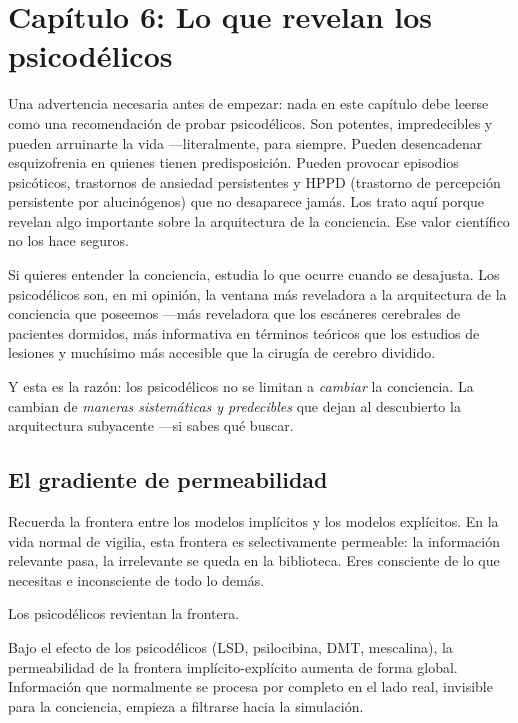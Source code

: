 \documentclass[11pt, twoside, openright]{book}
\begin{document}
\chapter*{Capítulo 6: Lo que revelan los psicodélicos}

Una advertencia necesaria antes de empezar: nada en este capítulo debe leerse como una recomendación de probar psicodélicos. Son potentes, impredecibles y pueden arruinarte la vida ---literalmente, para siempre. Pueden desencadenar esquizofrenia en quienes tienen predisposición. Pueden provocar episodios psicóticos, trastornos de ansiedad persistentes y HPPD (trastorno de percepción persistente por alucinógenos) que no desaparece jamás. Los trato aquí porque revelan algo importante sobre la arquitectura de la conciencia. Ese valor científico no los hace seguros.

Si quieres entender la conciencia, estudia lo que ocurre cuando se desajusta. Los psicodélicos son, en mi opinión, la ventana más reveladora a la arquitectura de la conciencia que poseemos ---más reveladora que los escáneres cerebrales de pacientes dormidos, más informativa en términos teóricos que los estudios de lesiones y muchísimo más accesible que la cirugía de cerebro dividido.

Y esta es la razón: los psicodélicos no se limitan a \textit{cambiar} la conciencia. La cambian de \textit{maneras sistemáticas y predecibles} que dejan al descubierto la arquitectura subyacente ---si sabes qué buscar.

\section*{El gradiente de permeabilidad}

Recuerda la frontera entre los modelos implícitos y los modelos explícitos. En la vida normal de vigilia, esta frontera es selectivamente permeable: la información relevante pasa, la irrelevante se queda en la biblioteca. Eres consciente de lo que necesitas e inconsciente de todo lo demás.

Los psicodélicos revientan la frontera.

Bajo el efecto de los psicodélicos (LSD, psilocibina, DMT, mescalina), la permeabilidad de la frontera implícito-explícito aumenta de forma global. Información que normalmente se procesa por completo en el lado real, invisible para la conciencia, empieza a filtrarse hacia la simulación.
\end{document}
